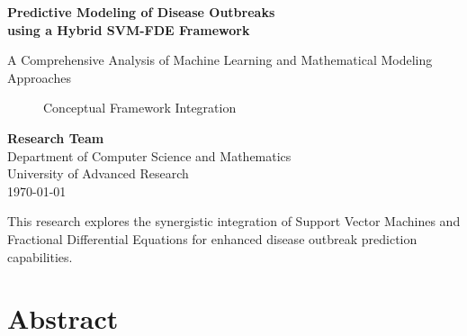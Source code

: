 \documentclass[12pt,a4paper]{report}
\begin{document}
\begin{titlepage}
    \centering
    \vspace*{2cm}
    
    {\Huge\bfseries\color{blue} Predictive Modeling of Disease Outbreaks\\[0.5cm] using a Hybrid SVM-FDE Framework}
    
    \vspace{1.5cm}
    
    {\Large A Comprehensive Analysis of Machine Learning and Mathematical Modeling Approaches}
    
    \vspace{2cm}
    
    \begin{figure}[H]
        \centering
        \caption{Conceptual Framework Integration}
    \end{figure}
    
    \vspace{2cm}
    
    {\large \textbf{Research Team}}\\[0.5cm]
    {\large Department of Computer Science and Mathematics}\\[0.3cm]
    {\large University of Advanced Research}\\[0.3cm]
    {\large \today}
    
    \vfill
    
    {\small This research explores the synergistic integration of Support Vector Machines and Fractional Differential Equations for enhanced disease outbreak prediction capabilities.}
\end{titlepage}

\newpage

\chapter*{Abstract}
\end{document}
